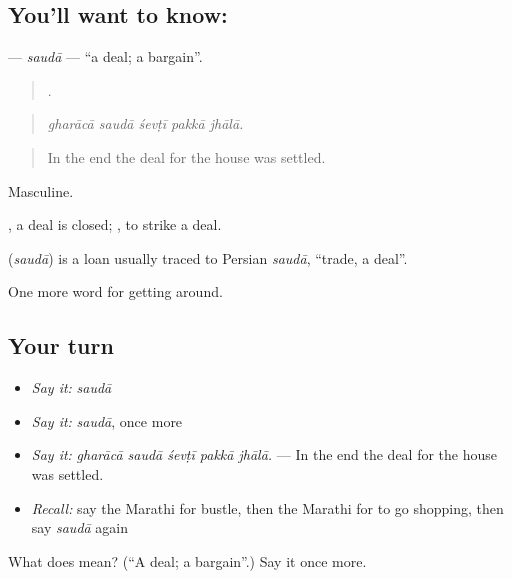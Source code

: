\subsection*{You'll want to know: }
\textbf{} — \emph{saudā} — \textquotedblleft{}a deal; a bargain\textquotedblright{}.

\begin{quote}
    .
\end{quote}

\begin{quote}
\emph{gharācā saudā śevṭī pakkā jhālā.}
\end{quote}

\begin{quote}
In the end the deal for the house was settled.
\end{quote}

Masculine.

  , a deal is closed;  , to strike a deal.

\begin{cousinweb}
\textbf{} (\emph{saudā}) is a loan usually traced to Persian \emph{saudā}, \textquotedblleft{}trade, a deal\textquotedblright{}.
\end{cousinweb}

\begin{grammarlens}[title={What you've built}]
One more word for getting around.
\end{grammarlens}

\subsection*{Your turn}
\begin{itemize}
\raggedright
  \item \emph{Say it:} \emph{saudā}
  \item \emph{Say it:} \emph{saudā}, once more
  \item \emph{Say it:} \emph{gharācā saudā śevṭī pakkā jhālā.} — In the end the deal for the house was settled.
  \item \emph{Recall:} say the Marathi for bustle, then the Marathi for to go shopping, then say \emph{saudā} again
\end{itemize}

\begin{tcolorbox}[breakable,colback=teal!4,colframe=teal!35!black,title={Before you move on}]
What does  mean? (\textquotedblleft{}A deal; a bargain\textquotedblright{}.) Say it once more.
\end{tcolorbox}
